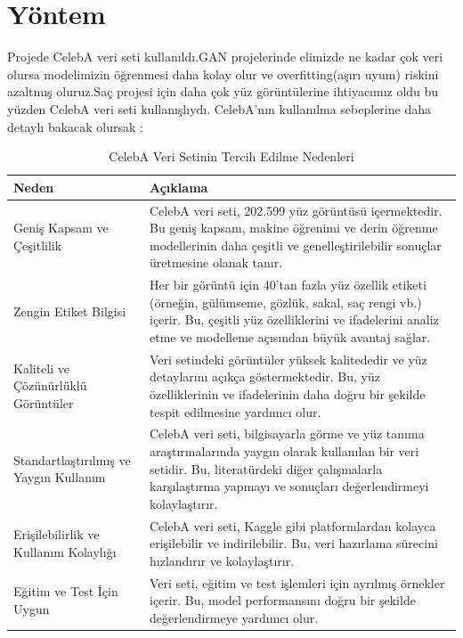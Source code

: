 \documentclass[12pt]{article}
\begin{document}
\section{Yöntem}
Projede CelebA veri seti kullanıldı.GAN projelerinde elimizde ne kadar çok veri olursa modelimizin öğrenmesi daha kolay olur ve overfitting(aşırı uyum) riskini azaltmış oluruz.Saç projesi için daha çok yüz görüntülerine ihtiyacımız oldu bu yüzden CelebA veri seti kullanışlıydı.
CelebA'nın kullanılma sebeplerine daha detaylı bakacak olursak :
\begin{table}[ht]
\centering
\begin{adjustbox}{max width=\textwidth}
\begin{tabular}{|p{4cm}|p{10cm}|}
\hline
\textbf{Neden} & \textbf{Açıklama} \\
\hline
Geniş Kapsam ve Çeşitlilik & CelebA veri seti, 202.599 yüz görüntüsü içermektedir. Bu geniş kapsam, makine öğrenimi ve derin öğrenme modellerinin daha çeşitli ve genelleştirilebilir sonuçlar üretmesine olanak tanır. \\
\hline
Zengin Etiket Bilgisi & Her bir görüntü için 40'tan fazla yüz özellik etiketi (örneğin, gülümseme, gözlük, sakal, saç rengi vb.) içerir. Bu, çeşitli yüz özelliklerini ve ifadelerini analiz etme ve modelleme açısından büyük avantaj sağlar. \\
\hline
Kaliteli ve Çözünürlüklü Görüntüler & Veri setindeki görüntüler yüksek kalitededir ve yüz detaylarını açıkça göstermektedir. Bu, yüz özelliklerinin ve ifadelerinin daha doğru bir şekilde tespit edilmesine yardımcı olur. \\
\hline
Standartlaştırılmış ve Yaygın Kullanım & CelebA veri seti, bilgisayarla görme ve yüz tanıma araştırmalarında yaygın olarak kullanılan bir veri setidir. Bu, literatürdeki diğer çalışmalarla karşılaştırma yapmayı ve sonuçları değerlendirmeyi kolaylaştırır. \\
\hline
Erişilebilirlik ve Kullanım Kolaylığı & CelebA veri seti, Kaggle gibi platformlardan kolayca erişilebilir ve indirilebilir. Bu, veri hazırlama sürecini hızlandırır ve kolaylaştırır. \\
\hline
Eğitim ve Test İçin Uygun & Veri seti, eğitim ve test işlemleri için ayrılmış örnekler içerir. Bu, model performansını doğru bir şekilde değerlendirmeye yardımcı olur. \\
\hline
\end{tabular}
\end{adjustbox}
\caption{CelebA Veri Setinin Tercih Edilme Nedenleri}
\label{tab:celeba_reasons}
\end{table}
\end{document}
